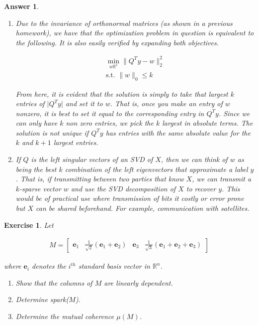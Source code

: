 \documentclass[12pt]{article}
\theoremstyle{colon}
\newtheorem{exercise}{Exercise}
\newtheorem*{answer}{Answer}
\begin{document}
\begin{answer}
  \

  \begin{enumerate}[label=\alph*)]
    \item Due to the invariance of orthonormal matrices (as shown in a previous homework), we have that the optimization problem in question is equivalent to the following. It is also easily verified by expanding both objectives.

      \begin{gather*}
        \min_{w \mathbb{R}^r} \lVert Q^T y - w \rVert_2^2 \\
        \text{s.t. } \lVert w \rVert_0 \leq k
      \end{gather*}

      From here, it is evident that the solution is simply to take that largest $k$ entries of $\lvert Q^T y \rvert$ and set it to $w$. That is, once you make an entry of $w$ nonzero, it is best to set it equal to the corresponding entry in $Q^T y$. Since we can only have $k$ non zero entries, we pick the $k$ largest in absolute terms. The solution is not unique if $Q^T y$ has entries with the same absolute value for the $k$ and $k+1$ largest entries.

    \item If $Q$ is the left singular vectors of an SVD of $X$, then we can think of $w$ as being the best $k$ combination of the left eigenvectors that approximate a label $y$. That is, if transmitting between two parties that know $X$, we can transmit a $k$-sparse vector $w$ and use the SVD decomposition of $X$ to recover $y$. This would be of practical use where transmission of bits it costly or error prone but $X$ can be shared beforehand. For example, communication with satellites.
  \end{enumerate}
\end{answer}

\clearpage

\begin{exercise}
  Let

  \begin{gather*}
    M = \begin{bmatrix} \bm{e}_1 & \frac{1}{\sqrt{2}} (\bm{e}_1 + \bm{e}_2) & \bm{e}_3 & \frac{1}{\sqrt{3}} (\bm{e}_1 + \bm{e}_2 + \bm{e}_3)\end{bmatrix}
  \end{gather*}

  where $\bm{e}_i$ denotes the $i^{th}$ standard basis vector in $\mathbb{R}^n$.

  \begin{enumerate}[label=\alph*)]
    \item Show that the columns of $M$ are linearly dependent.
    \item Determine spark($M$).
    \item Determine the mutual coherence $\mu(M)$.
  \end{enumerate}
\end{exercise}
\end{document}
